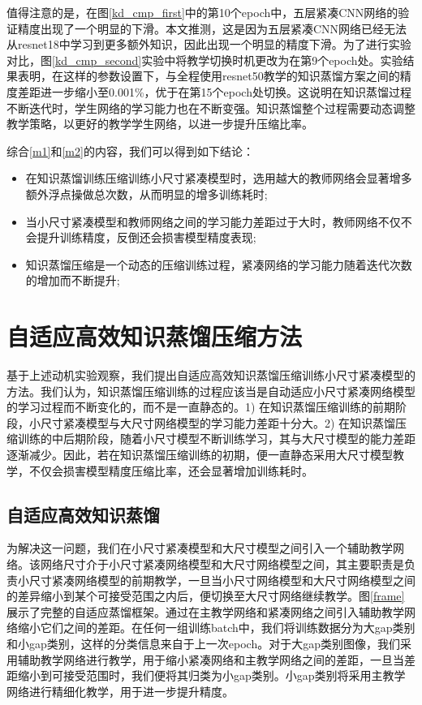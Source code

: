 值得注意的是，在图\ref{kd_cmp_first}中的第10个epoch中，五层紧凑CNN网络的验证精度出现了一个明显的下滑。本文推测，这是因为五层紧凑CNN网络已经无法从resnet18中学习到更多额外知识，因此出现一个明显的精度下滑。为了进行实验对比，图\ref{kd_cmp_second}实验中将教学切换时机更改为在第9个epoch处。实验结果表明，在这样的参数设置下，与全程使用resnet50教学的知识蒸馏方案之间的精度差距进一步缩小至0.001\%，优于在第15个epoch处切换。这说明在知识蒸馏过程不断迭代时，学生网络的学习能力也在不断变强。知识蒸馏整个过程需要动态调整教学策略，以更好的教学学生网络，以进一步提升压缩比率。

综合\ref{m1}和\ref{m2}的内容，我们可以得到如下结论：
\begin{itemize}
	\item 在知识蒸馏训练压缩训练小尺寸紧凑模型时，选用越大的教师网络会显著增多额外浮点操做总次数，从而明显的增多训练耗时;
	\item 当小尺寸紧凑模型和教师网络之间的学习能力差距过于大时，教师网络不仅不会提升训练精度，反倒还会损害模型精度表现;
	\item 知识蒸馏压缩是一个动态的压缩训练过程，紧凑网络的学习能力随着迭代次数的增加而不断提升;
\end{itemize}


\section{自适应高效知识蒸馏压缩方法}

基于上述动机实验观察，我们提出自适应高效知识蒸馏压缩训练小尺寸紧凑模型的方法。我们认为，知识蒸馏压缩训练的过程应该当是自动适应小尺寸紧凑网络模型的学习过程而不断变化的，而不是一直静态的。1) 在知识蒸馏压缩训练的前期阶段，小尺寸紧凑模型与大尺寸网络模型的学习能力差距十分大。2) 在知识蒸馏压缩训练的中后期阶段，随着小尺寸模型不断训练学习，其与大尺寸模型的能力差距逐渐减少。因此，若在知识蒸馏压缩训练的初期，便一直静态采用大尺寸模型教学，不仅会损害模型精度压缩比率，还会显著增加训练耗时。


\subsection{自适应高效知识蒸馏}
为解决这一问题，我们在小尺寸紧凑模型和大尺寸模型之间引入一个辅助教学网络。该网络尺寸介于小尺寸紧凑网络模型和大尺寸网络模型之间，其主要职责是负责小尺寸紧凑网络模型的前期教学，一旦当小尺寸网络模型和大尺寸网络模型之间的差异缩小到某个可接受范围之内后，便切换至大尺寸网络继续教学。图\ref{frame}展示了完整的自适应蒸馏框架。通过在主教学网络和紧凑网络之间引入辅助教学网络缩小它们之间的差距。在任何一组训练batch中，我们将训练数据分为大gap类别和小gap类别，这样的分类信息来自于上一次epoch。对于大gap类别图像，我们采用辅助教学网络进行教学，用于缩小紧凑网络和主教学网络之间的差距，一旦当差距缩小到可接受范围时，我们便将其归类为小gap类别。小gap类别将采用主教学网络进行精细化教学，用于进一步提升精度。

